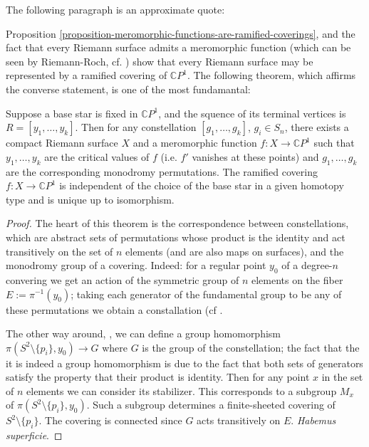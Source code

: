 The following paragraph is an approximate quote:

Proposition \ref{proposition-meromorphic-functions-are-ramified-coverings}, and
the fact that every Riemann surface admits a meromorphic function (which can be
seen by Riemann-Roch, cf. \cite[Fact 1.8.6]{lando}) show that every Riemann
surface may be represented by a ramified covering of $\mathbb{C}P^{1}$. The
following theorem, which affirms the converse statement, is one of the most
fundamantal:

\begin{theorem}
\label{theorem-Riemann-existence}
\begin{reference}
\cite[Theorem 1.8.14]{lando}
\end{reference}
Suppose a base star is fixed in $\mathbb{C}P^{1}$, and the squence of its
terminal vertices is $R=[y_1,\ldots,y_k]$. Then for any constellation
$[g_1,\ldots,g_k]$, $g_i \in S_n$, there exists a compact Riemann surface $X$
and a meromorphic function $f:X \to \mathbb{C}P^{1}$ such that $y_1,\ldots,y_k$
are the critical values of $f$ (i.e. $f'$ vanishes at these points) and
$g_1,\ldots,g_k$ are the corresponding monodromy permutations. The ramified
covering $f:X\to \mathbb{C}P^{1}$ is independent of the choice of the base star
in a given homotopy type and is unique up to isomorphism.
\end{theorem}

\begin{proof}
The heart of this theorem is the correspondence between constellations, which
are abstract sets of permutations whose product is the identity and act
transitively on the set of $n$ elements (and are also maps on surfaces), and the
monodromy group of a covering. Indeed: for a regular point $y_0$ of a degree-$n$
convering we get an action of the symmetric group of $n$ elements on the fiber
$E:=\pi^{-1}(y_0)$; taking each generator of the fundamental group to be any of
these permutations we obtain a constallation (cf \cite[Construction
1.2.13]{lando}.

The other way around, \cite[Proposition 1.2.15]{lando}, we can define a group
homomorphism $\pi(S^2\setminus\{p_i\},y_0)\to G$ where $G$ is the group of the
constellation; the fact that the it is indeed a group homomorphism is due to the
fact that both sets of generators satisfy the property that their product is
identity. Then for any point $x$ in the set of $n$ elements we can consider its
stabilizer. This corresponds to a subgroup $M_x$ of
$\pi(S^2\setminus\{p_i\},y_0)$. Such a subgroup determines a finite-sheeted
covering of $S^2\setminus\{p_i\}$. The covering is connected since $G$ acts
transitively on $E$. {\it Habemus superficie}.
\end{proof}

